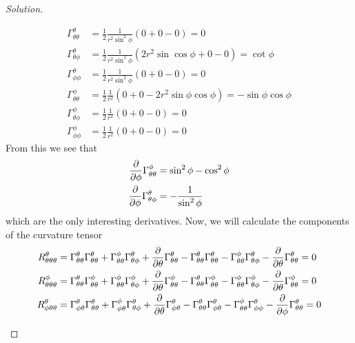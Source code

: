 \documentclass[a4paper]{article}
\begin{document}
\begin{proof}[Solution]
\begin{enumerate}[(a)]
  \[
    \begin{aligned}
      \Gamma_{\theta \theta}^\theta &= \frac{1}{2}\frac{1}{r^2 \sin^2 \phi} \left(0 +  0 - 0\right) = 0 \\
      \Gamma_{\theta \phi}^\theta &=  \frac{1}{2} \frac{1}{r^2 \sin^2 \phi} \left(2r^2 \sin \cos\phi + 0 - 0  \right) = \cot\phi \\
      \Gamma_{\phi \phi}^\theta &= \frac{1}{2} \frac{1}{r^2 \sin^2 \phi} \left(0 + 0 - 0  \right) = 0 \\
      \Gamma_{\theta \theta}^\phi &= \frac{1}{2} \frac{1}{r^2} \left(0 + 0 - 2r^2 \sin \phi \cos \phi \right) = -\sin \phi \cos \phi \\
      \Gamma_{\theta \phi}^\phi &= \frac{1}{2} \frac{1}{r^2} \left(0 + 0 - 0\right) = 0 \\
      \Gamma_{\phi \phi}^\phi &= \frac{1}{2} \frac{1}{r^2} \left( 0 + 0 - 0 \right) = 0
    \end{aligned}
  \]
  From this we see that
  \[
    \begin{aligned}
      \pdv{\phi} \Gamma_{\theta \theta}^\phi &= \sin^2 \phi - \cos^2 \phi \\
      \pdv{\phi} \Gamma_{\theta \phi}^\theta &= - \frac{1}{\sin^2 \phi} 
    \end{aligned}
  \]
  which are the only interesting derivatives. Now, we will calculate the components of the curvature tensor
  \[
    \begin{aligned}
      R_{\theta \theta \theta}^\theta &= \Gamma_{\theta \theta}^\theta \Gamma_{\theta \theta}^\theta + \Gamma_{\theta \theta}^\phi \Gamma_{\theta \phi}^{\theta} + \pdv{\theta} \Gamma_{\theta \theta}^\theta - \Gamma_{\theta \theta}^\theta \Gamma_{\theta \theta}^\theta - \Gamma_{\theta \theta}^\phi \Gamma_{\theta \phi}^\theta - \pdv{\theta} \Gamma_{\theta \theta}^\theta = 0\\
      R_{\theta \theta \theta}^\phi &= \Gamma_{\theta \theta}^\theta \Gamma_{\theta \theta}^\phi + \Gamma_{\theta \theta}^\phi \Gamma_{\theta \phi}^\phi + \pdv{\theta} \Gamma_{\theta \theta}^\phi - \Gamma_{\theta \theta}^\theta \Gamma_{\theta \theta}^\phi  - \Gamma_{\theta \theta}^\phi \Gamma_{\theta \phi}^\phi - \pdv{\theta} \Gamma_{\theta \theta}^\phi = 0 \\
      R_{\phi \theta \theta}^\theta &= \Gamma_{\phi \theta}^\theta \Gamma_{\theta \theta}^\theta + \Gamma_{\phi \theta}^\phi \Gamma_{\theta \phi}^\theta + \pdv{\theta} \Gamma_{\phi \theta}^\theta - \Gamma_{\theta \theta}^\theta \Gamma_{\phi \theta}^\theta  - \Gamma_{\theta \theta}^\phi \Gamma_{\phi \phi}^\theta - \pdv{\phi} \Gamma_{\theta \theta}^\theta = 0 \\

\end{aligned}\]
\end{enumerate}
\end{proof}
\end{document}

